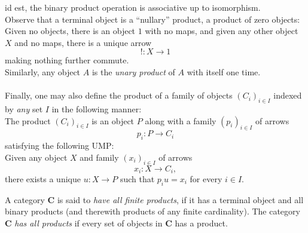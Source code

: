 id est, the binary product operation is associative up to isomorphism.\\
Observe that a terminal object is a ``nullary'' product, a product of zero objects:\\
Given no objects, there is an object $1$ with no maps, and given any other object $X$ and no maps, there is a unique arrow
\begin{equation*} 
	!:X \to 1
\end{equation*}
making nothing further commute.\\
Similarly, any object $A$ is the \emph{unary product} of $A$ with itself one time.\\~\\
Finally, one may also define the product of a family of objects $(C_i)_{i \in I}$ indexed by \emph{any} set $I$ in the following manner:\\
The product $(C_i)_{i \in I}$ is an object $P$ along with a family $(p_i)_{i \in I}$ of arrows
\begin{equation*} 
	p_i:P \to C_i
\end{equation*}
satisfying the following UMP:\\
Given any object $X$ and family $(x_i)_{i \in I}$ of arrows
\begin{equation*} 
	x_i:X \to C_i,
\end{equation*}
there exists a unique $u:X \to P$ such that $p_iu = x_i$ for every $i \in I.$
\begin{defn} 
	A category $\mathbf{C}$ is said to \emph{have all finite products}, if it has a terminal object and all binary products (and therewith products of any finite cardinality). The category $\mathbf{C}$ \emph{has all products} if every set of objects in $\mathbf{C}$ has a product.
\end{defn}
%
%
